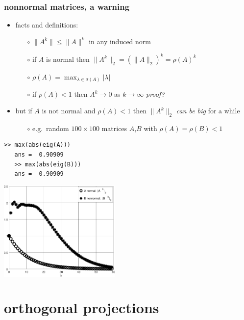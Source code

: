 \documentclass[10pt,hyperref]{beamer}
\begin{document}
\begin{frame}[fragile]
\frametitle{nonnormal matrices, a warning}

\begin{itemize}
\item facts and definitions:
    \begin{itemize}
    \item[$\circ$] $\|A^k\|\le \|A\|^k$ in any induced norm
    \item[$\circ$] if $A$ is normal then $\|A^k\|_2 = (\|A\|_2)^k = \rho(A)^k$
    \item[$\circ$] $\rho(A) = \max_{\lambda\in\sigma(A)} |\lambda|$
    \item[$\circ$] if $\rho(A)<1$ then $A^k \to 0$ as $k\to \infty$ \hfill \emph{proof?}
    \end{itemize}
\item but if $A$ is not normal and $\rho(A)<1$ then $\|A^k\|_2$ \emph{can be big} for a while
    \begin{itemize}
    \item[$\circ$] e.g.~random $100\times 100$ matrices $A$,$B$ with $\rho(A)=\rho(B)<1$
    \end{itemize}
\end{itemize}

\bigskip
\begin{Verbatim}[fontsize=\footnotesize]
   >> max(abs(eig(A)))
   ans =  0.90909
   >> max(abs(eig(B)))
   ans =  0.90909
\end{Verbatim}

\vspace{-17mm}
\hfill \includegraphics[width=0.45\textwidth]{figs/normpowers} \quad \phantom{foo}
\end{frame}


\section{orthogonal projections}
\end{document}
